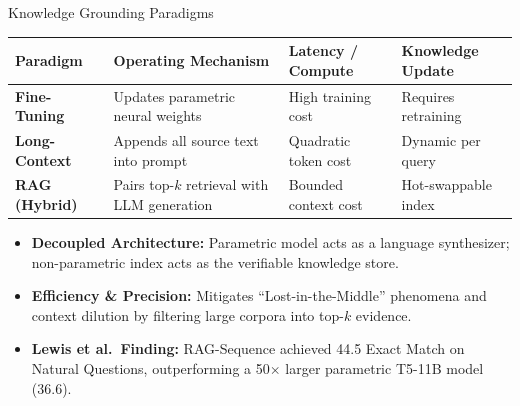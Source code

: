 \begin{frame}{Knowledge Grounding Paradigms}
  \vspace{-0.1cm}
  \begin{table}[H]
    \centering
    \footnotesize
    \renewcommand{\arraystretch}{1.2}
    \begin{tabularx}{\textwidth}{>{\bfseries}l X l l}
      \toprule
      \rowcolor{tableheader}
      Paradigm & Operating Mechanism & Latency / Compute & Knowledge Update \\
      \midrule
      Fine-Tuning & Updates parametric neural weights & High training cost & Requires retraining \\
      Long-Context & Appends all source text into prompt & Quadratic token cost & Dynamic per query \\
      RAG (Hybrid) & Pairs top-$k$ retrieval with LLM generation & Bounded context cost & Hot-swappable index \\
      \bottomrule
    \end{tabularx}
  \end{table}

  \vspace{0.1cm}
  \begin{itemize}
    \setlength{\itemsep}{0.2cm}
    \item \textbf{Decoupled Architecture:} Parametric model acts as a language synthesizer; non-parametric index acts as the verifiable knowledge store.
    \item \textbf{Efficiency \& Precision:} Mitigates ``Lost-in-the-Middle'' phenomena and context dilution by filtering large corpora into top-$k$ evidence.
    \item \textbf{Lewis et al.\ Finding:} RAG-Sequence achieved 44.5 Exact Match on Natural Questions, outperforming a 50$\times$ larger parametric T5-11B model (36.6).
  \end{itemize}

\end{frame}
